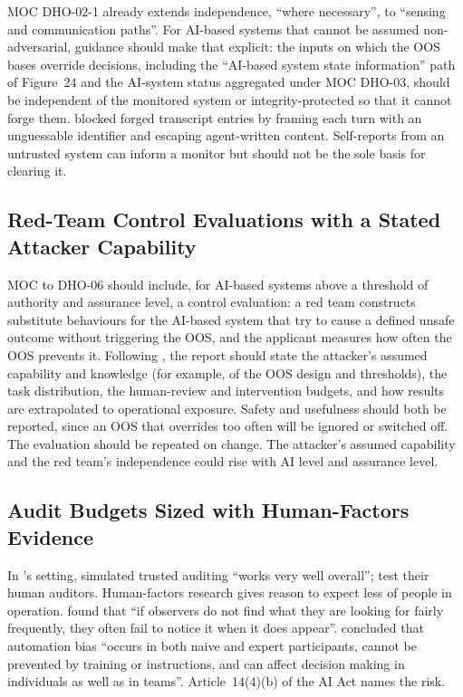 \documentclass{aer}
\begin{document}
MOC DHO-02-1 already extends independence, ``where necessary'', to ``sensing and communication paths''. For AI-based systems that cannot be assumed non-adversarial, guidance should make that explicit: the inputs on which the OOS bases override decisions, including the ``AI-based system state information'' path of Figure~24 and the AI-system status aggregated under MOC DHO-03, should be independent of the monitored system or integrity-protected so that it cannot forge them. \citet{remedios2026redteaming} blocked forged transcript entries by framing each turn with an unguessable identifier and escaping agent-written content. Self-reports from an untrusted system can inform a monitor but should not be the sole basis for clearing it.

\subsection{Red-Team Control Evaluations with a Stated Attacker Capability}\label{sec:redteam}

MOC to DHO-06 should include, for AI-based systems above a threshold of authority and assurance level, a control evaluation: a red team constructs substitute behaviours for the AI-based system that try to cause a defined unsafe outcome without triggering the OOS, and the applicant measures how often the OOS prevents it. Following \citet{korbak2025sketch}, the report should state the attacker's assumed capability and knowledge (for example, of the OOS design and thresholds), the task distribution, the human-review and intervention budgets, and how results are extrapolated to operational exposure. Safety and usefulness should both be reported, since an OOS that overrides too often will be ignored or switched off. The evaluation should be repeated on change. The attacker's assumed capability and the red team's independence could rise with AI level and assurance level.

\subsection{Audit Budgets Sized with Human-Factors Evidence}\label{sec:audit}

In \citeauthor{greenblatt2023control}'s \citeyearpar{greenblatt2023control} setting, simulated trusted auditing ``works very well overall''; \citet{korbak2025sketch} test their human auditors. Human-factors research gives reason to expect less of people in operation. \citet{wolfe2005rare} found that ``if observers do not find what they are looking for fairly frequently, they often fail to notice it when it does appear''. \citet{parasuraman2010complacency} concluded that automation bias ``occurs in both naive and expert participants, cannot be prevented by training or instructions, and can affect decision making in individuals as well as in teams''. Article~14(4)(b) of the AI Act names the risk.
\end{document}
